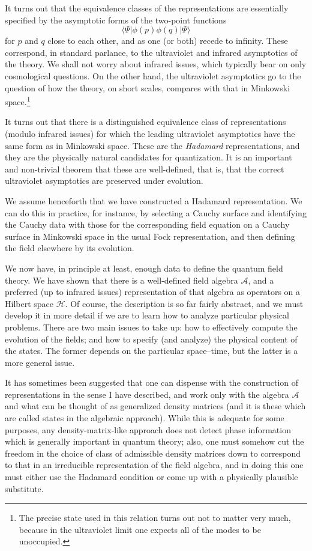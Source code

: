 \documentclass[12pt]{article}
\newcommand{\A}{{\mathcal A}}
\newcommand{\HH}{{\mathcal H}}
\begin{document}
It turns out that the equivalence classes of the representations are essentially specified by the asymptotic forms of the two-point functions
\begin{equation}
  \langle\Psi | \phi (p)\phi (q) |\Psi\rangle
\end{equation}
for $p$ and $q$ close to each other, and as one (or both) recede to infinity.
These correspond, in standard parlance, to the ultraviolet and infrared asymptotics of the theory.  We shall not worry about infrared issues, which typically bear on only cosmological questions.  On the other hand, the ultraviolet asymptotics go to the question of how the theory, on short scales, compares with that in Minkowski space.\footnote{The precise state used in this relation turns out not to matter very much, because in the ultraviolet limit one expects all of the modes to be unoccupied.}

It turns out that there is a distinguished equivalence class of representations (modulo infrared issues) for which the leading ultraviolet asymptotics have the same form as in Minkowski space.  These are the {\em Hadamard} representations, and they are the physically natural candidates for quantization.  It is an important and non-trivial theorem that these are well-defined, that is, that the correct ultraviolet asymptotics are preserved under evolution.

We assume henceforth that we have constructed a Hadamard representation.  We can do this in practice, for instance, by selecting a Cauchy surface and identifying the Cauchy data with those for the corresponding field equation on a Cauchy surface in Minkowski space in the usual Fock representation, and then defining the field elsewhere by its evolution.  
  
We now have, in principle at least, enough data to define the quantum field theory.  We have shown that there is a well-defined field algebra $\A$, and a preferred (up to infrared issues) representation of that algebra as operators on a Hilbert space $\HH$.  Of course, the description is so far fairly abstract, and we must develop it in more detail if we are to learn how to analyze particular physical problems.
There are two main issues to  take up:  how to effectively compute the evolution of the fields; and how to specify (and analyze) the physical content of the states.  The former depends on the particular space--time, but the latter is a more general issue.

It has sometimes been suggested that one can dispense with the construction of representations in the sense I have described, and
work only with the algebra $\A$ and what can be thought of as generalized density matrices (and it is these which are called states in the algebraic approach).  While this is adequate for some purposes, any density-matrix-like approach does not detect phase information which is generally important in quantum theory; also, one must somehow cut the freedom in the choice of class of admissible density matrices down to correspond to that in an irreducible representation of the field algebra, and in doing this one must either use the Hadamard condition or come up with a physically plausible substitute.
\end{document}
